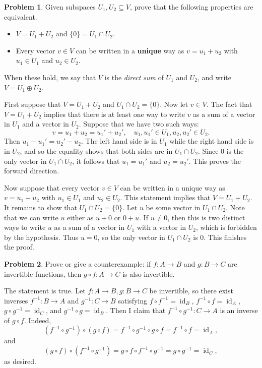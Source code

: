 \documentclass[11pt,oneside]{amsart}
\theoremstyle{definition}
\newtheorem{problem}{Problem}
\DeclareMathOperator{\id}{id}
\begin{document}
    \begin{problem}
        Given subspaces $U_1,U_2\subseteq V$, prove that the following properties are equivalent.
        \begin{itemize}
            \item $V=U_1+U_2$ and $\{0\}=U_1\cap U_2$.
            \item Every vector $v\in V$ can be written in a \textbf{unique} way as $v=u_1+u_2$ with $u_1\in U_1$ and $u_2\in U_2$.
        \end{itemize}
        When these hold, we say that $V$ is the \emph{direct sum} of $U_1$ and $U_2$, and write $V=U_1\oplus U_2$.
    \end{problem}
    \begin{solution}
        First suppose that $V=U_1+U_2$ and $U_1\cap U_2=\{0\}$. Now let $v\in V$. The fact that $V=U_1+U_2$ implies that there is at least one way to write $v$ as a sum of a vector in $U_1$ and a vector in $U_2$. Suppose that we have two such ways:
        \[v=u_1+u_2=u_1'+u_2',\quad u_1,u_1'\in U_1, u_2,u_2'\in U_2.\]
        Then $u_1-u_1'=u_2'-u_2$. The left hand side is in $U_1$ while the right hand side is in $U_2$, and so the equality shows that both sides are in $U_1\cap U_2$. Since 0 is the only vector in $U_1\cap U_2$, it follows that $u_1=u_1'$ and $u_2=u_2'$. This proves the forward direction.

        Now suppose that every vector $v\in V$ can be written in a unique way as $v=u_1+u_2$ with $u_1\in U_1$ and $u_2\in U_2$. This statement implies that $V=U_1+U_2$. It remains to show that $U_1\cap U_2=\{0\}$. Let $u$ be some vector in $U_1\cap U_2$. Note that we can write $u$ either as $u+0$ or $0+u$. If $u\neq 0$, then this is two distinct ways to write $u$ as a sum of a vector in $U_1$ with a vector in $U_2$, which is forbidden by the hypothesis. Thus $u=0$, so the only vector in $U_1\cap U_2$ is 0. This finishes the proof.
    \end{solution}

    \begin{problem}
        Prove or give a counterexample: if $f\colon A\to B$ and $g\colon B\to C$ are invertible functions, then $g\circ f\colon A\to C$ is also invertible.
    \end{problem}
    \begin{solution}
        The statement is true. Let $f\colon A\to B,g\colon B\to C$ be invertible, so there exist inverses $f^{-1}\colon B\to A$ and $g^{-1}\colon C\to B$ satisfying $f\circ f^{-1}=\id_B$, $f^{-1}\circ f=\id_A$, $g\circ g^{-1}=\id_C$, and $g^{-1}\circ g=\id_B$. Then I claim that $f^{-1}\circ g^{-1}\colon C\to A$ is an inverse of $g\circ f$. Indeed,
        \[(f^{-1}\circ g^{-1})\circ (g\circ f)=f^{-1}\circ g^{-1}\circ g\circ f=f^{-1}\circ f=\id_A,\]
        and
        \[(g\circ f)\circ(f^{-1}\circ g^{-1})=g\circ f\circ f^{-1}\circ g^{-1}=g\circ g^{-1}=\id_C,\]
        as desired.
    \end{solution}
    
\end{document}
